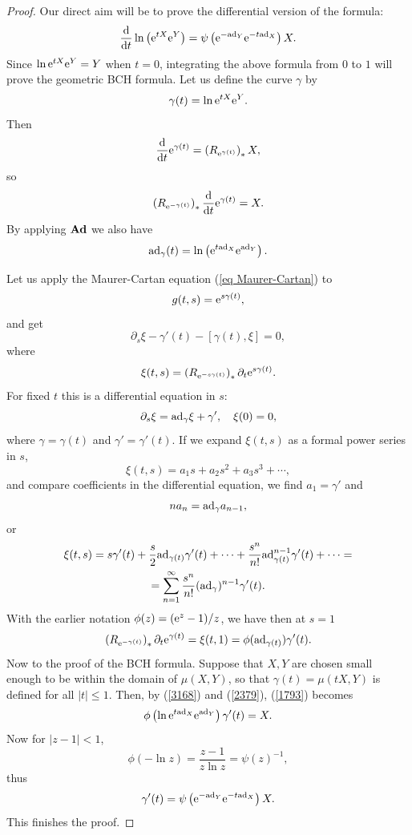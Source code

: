 \begin{proof}
    Our direct aim will be to prove the differential version of the formula:
    \[\frac{{\mathrm{d}}}{{\mathrm{d}} t}\ln\left(\mathrm{e}^{tX} \mathrm{e}^Y\right)=\psi\left(\mathrm{e}^{-\mathrm{ad}_Y}\mathrm{e}^{-t\mathrm{ad}_X}\right)X.\]
    Since $\ln \mathrm{e}^{tX} \mathrm{e}^{Y}=Y$ when $t=0$, integrating the above formula from $0$ to $1$ will prove the geometric BCH formula. Let us define the curve $\gamma$ by
    \[\gamma(t)=\ln \mathrm{e}^{tX} \mathrm{e}^{Y}.\]
    Then
    \[\frac{{\mathrm{d}}}{{\mathrm{d}} t} \mathrm{e}^{\gamma(t)}=\left(R_{\mathrm{e}^{\gamma(t)}}\right)_\ast X,\]
    so
    \[\left(R_{\mathrm{e}^{-\gamma(t)}}\right)_\ast\frac{{\mathrm{d}}}{{\mathrm{d}} t}\mathrm{e}^{\gamma(t)}=X.\label{2379}\]
    By applying $\mathrm{\mathbf{Ad}}$ we also have
    \[\mathrm{ad}_\gamma(t)=\ln\left(\mathrm{e}^{t\mathrm{ad}_X}\mathrm{e}^{\mathrm{ad}_{Y}}\right).\label{3168}\]
    
    Let us apply the Maurer-Cartan equation (\ref{eq Maurer-Cartan}) to
    \[g(t,s)=\mathrm{e}^{s\gamma(t)},\]
    and get 
    \[\partial_s \xi-\gamma'(t)-[\gamma(t),\xi]=0,\]
    where 
    \[\xi(t,s)=\left(R_{\mathrm{e}^{-s\gamma(t)}}\right)_\ast\partial_t \mathrm{e}^{s\gamma(t)}.\]
    For fixed $t$ this is a differential equation in $s$:
    \[\partial_s\xi=\mathrm{ad}_\gamma\xi+\gamma',\quad \xi(0)=0,\]
    where $\gamma=\gamma(t)$ and $\gamma'=\gamma'(t)$. If we expand $\xi(t,s)$ as a formal power series in $s$,
    \[\xi(t,s)=a_1s+a_2s^2+a_3s^3+\cdots,\]
    and compare coefficients in the differential equation, we find $a_1=\gamma'$ and 
    \[na_n=\mathrm{ad}_\gamma a_{n-1},\]
    or 
    \begin{multline}
        \xi(t,s)=s\gamma'(t)+\frac{s}{2}\mathrm{ad}_{\gamma(t)}\gamma'(t)+\cdots+\frac{s^n}{n!}\mathrm{ad}_{\gamma(t)}^{n-1}\gamma'(t)+\cdots=\\=\sum_{n=1}^\infty \frac{s^n}{n!}(\mathrm{ad}_\gamma)^{n-1}\gamma'(t).
    \end{multline}
    With the earlier notation $\phi(z)=(\mathrm{e}^z-1)/z$, we have then at $s=1$
    \[\left(R_{\mathrm{e}^{-\gamma(t)}}\right)_\ast \partial_t \mathrm{e}^{\gamma(t)}=\xi(t,1)=\phi(\mathrm{ad}_{\gamma(t)})\gamma'(t).\label{1793}\]
    Now to the proof of the BCH formula. Suppose that $X,Y$ are chosen small enough to be within the domain of $\mu(X,Y)$, so that $\gamma(t)=\mu(tX,Y)$ is defined for all $|t|\leq 1$. Then, by (\ref{3168}) and (\ref{2379}), (\ref{1793}) becomes
    \[\phi\left(\ln \mathrm{e}^{t\mathrm{ad}_X}\mathrm{e}^{\mathrm{ad}_Y}\right)\gamma'(t)=X.\]
    Now for $|z-1|<1$,
    \[\phi(-\ln z)=\frac{z-1}{z\ln z}=\psi(z)^{-1},\]
    thus
    \[\gamma'(t)=\psi\left(\mathrm{e}^{-\mathrm{ad}_Y}\mathrm{e}^{-t\mathrm{ad}_X}\right)X.\]
    This finishes the proof.
\end{proof}






